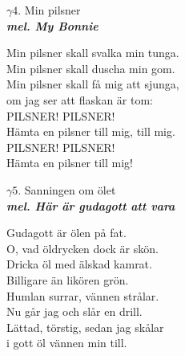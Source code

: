 \documentclass[a6paper,10pt]{article}
\newcommand{\mel}[1]{\small\textbf{\textit{mel. #1 \\}}}
\begin{document}
\setlength{\oddsidemargin}{-0.37in}
\begin{center}
\Large $\gamma4$. Min pilsner \\ 
\mel{My Bonnie}
\end{center}
Min pilsner skall svalka min tunga. \\
Min pilsner skall duscha min gom. \\
Min pilsner skall få mig att sjunga, \\
om jag ser att flaskan är tom: \\
\newline
PILSNER! PILSNER! \\
Hämta en pilsner till mig, till mig. \\
PILSNER! PILSNER! \\
Hämta en pilsner till mig!
\vspace{40pt}
\begin{center}
\Large $\gamma5$. Sanningen om ölet \\ 
\mel{Här är gudagott att vara}
\end{center}
Gudagott är ölen på fat. \\
O, vad öldrycken dock är skön. \\
Dricka öl med älskad kamrat. \\
Billigare än likören grön. \\
Humlan surrar, vännen strålar. \\
Nu går jag och slår en drill. \\
Lättad, törstig, sedan jag skålar \\
i gott öl vännen min till. 
\end{document}

